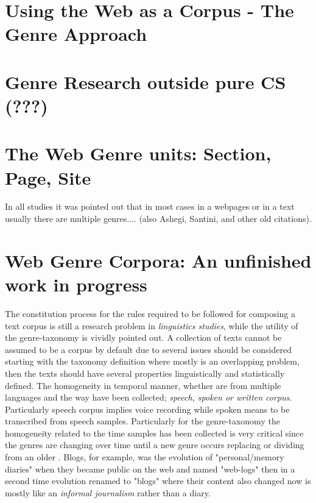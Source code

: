 \section{Using the Web as a Corpus - The Genre Approach}\label{chap:relevant_work:sec:intro}

\section{Genre Research outside pure CS (???)}\label{chap:relevant_work:sec:intro}


\section{The Web Genre units: Section, Page, Site}

In all studies it was pointed out that in most cases in a webpages or in a text usually there are multiple genres.... \parencite{lee2017text} (also Ashegi, Santini, and other old citations).


\section{Web Genre Corpora: An unfinished work in progress}\label{chap:relevant_work:sec:intro}

The constitution process for the rules required to be followed for composing a text corpus is still a research problem in \textit{linguistics studies}, while the utility of the genre-taxonomy is vividly pointed out. A collection of texts cannot be assumed to be a corpus by default due to several issues should be considered starting with the taxonomy definition where mostly is an overlapping problem, then the texts should have several properties linguistically and statistically defined. The homogeneity in temporal manner, whether are from multiple languages and the way have been collected; \textit{speech, spoken or written corpus}. Particularly speech corpus implies voice recording while spoken means to be transcribed from speech samples. Particularly for the genre-taxonomy the homogeneity related to the time samples has been collected is very critical since the genres are changing over time until a new genre occurs replacing or dividing from an older \parencite{dash2018history}. Blogs, for example, was the evolution of "personal/memory diaries" when they became public on the web and named "web-logs" then in a second time evolution renamed to "blogs" where their content also changed now is mostly like an \textit{informal journalism} rather than a diary.


